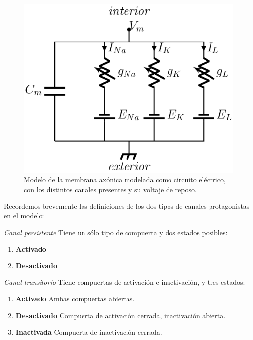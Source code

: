 \begin{figure}[H]
 \centering
 \includegraphics[scale=0.5]{../Figuras/circuito.png}
 \caption{Modelo de la membrana axónica modelada como circuito eléctrico, con los distintos canales presentes y su voltaje de reposo.}
 \label{fig:circuito1}
\end{figure}

Recordemos brevemente las definiciones de los dos tipos de canales protagonistas en el modelo:

\begin{definition}
 \emph{Canal persistente} Tiene un sólo tipo de compuerta y dos estados posibles:
 \begin{enumerate}
  \item \textbf{Activado}
  \item \textbf{Desactivado}
 \end{enumerate}

\end{definition}

\begin{definition}
 \emph{Canal transitorio} Tiene compuertas de activación e inactivación, y tres estados:
 \begin{enumerate}
  \item \textbf{Activado} Ambas compuertas abiertas.
  \item \textbf{Desactivado} Compuerta de activación cerrada, inactivación abierta.
  \item \textbf{Inactivada} Compuerta de inactivación cerrada.
 \end{enumerate}

\end{definition}


